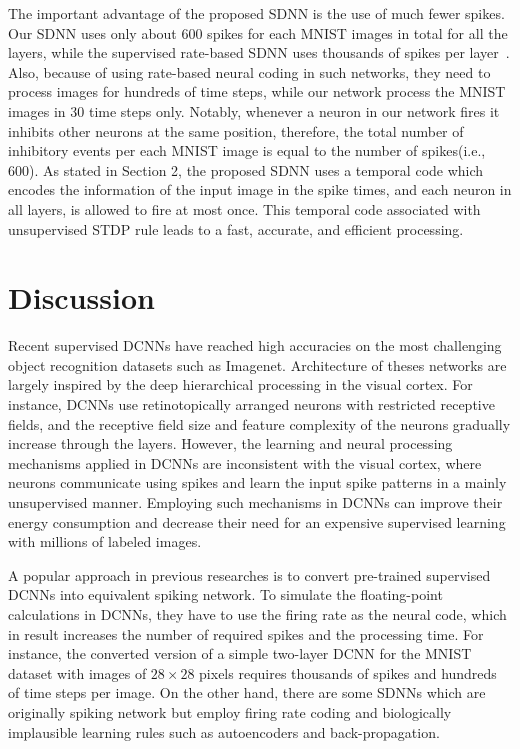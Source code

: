 \documentclass[preprint,5p,12pt,twocolumn]{article}
\begin{document}
The important advantage of the proposed SDNN is the use of much fewer spikes. Our SDNN  uses only about 600 spikes for each MNIST images in total for  all the layers, while the supervised rate-based SDNN uses thousands of spikes per layer~\cite{diehl2015fast}. Also, because of using rate-based neural coding in such networks, they need to process images for hundreds of time steps, while our network process the MNIST images in 30 time steps only. Notably, whenever a neuron in our network fires it inhibits other neurons at the same position, therefore, the total number of inhibitory events per each MNIST image is equal to the number of spikes(i.e., 600). As stated in Section 2, the proposed SDNN uses a temporal code which encodes the information of the input image in the spike times, and each neuron in all  layers, is allowed to fire at most once. This temporal code associated with unsupervised STDP rule leads to a fast, accurate, and efficient processing.






\section*{Discussion}
Recent supervised DCNNs have reached high accuracies on the most challenging object recognition datasets such as Imagenet. Architecture of theses networks are largely inspired by the deep hierarchical processing in the visual cortex. For instance, DCNNs  use retinotopically arranged neurons with restricted receptive fields, and the receptive field size and feature complexity of the neurons gradually increase through the layers. However, the learning and neural processing mechanisms applied in DCNNs are inconsistent with the visual cortex, where neurons communicate using spikes and learn the input spike patterns in a mainly unsupervised manner. Employing such mechanisms in DCNNs can improve their energy consumption and decrease their need for an expensive supervised learning with millions of labeled images.

A popular approach in previous researches is to convert pre-trained supervised DCNNs into equivalent spiking network. To simulate the floating-point calculations in DCNNs, they  have to use the firing rate as the neural code, which in result increases the number of required spikes and the processing time. For instance, the converted version of a simple two-layer DCNN for the MNIST dataset with images of $28 \times 28$ pixels requires thousands of spikes and hundreds of time steps per image. On the other hand, there are some SDNNs \cite{panda2016unsupervised,burbank2015mirrored,bengio2015towards} which are originally spiking network but employ firing rate coding and  biologically implausible learning rules such as autoencoders and back-propagation.
\end{document}

